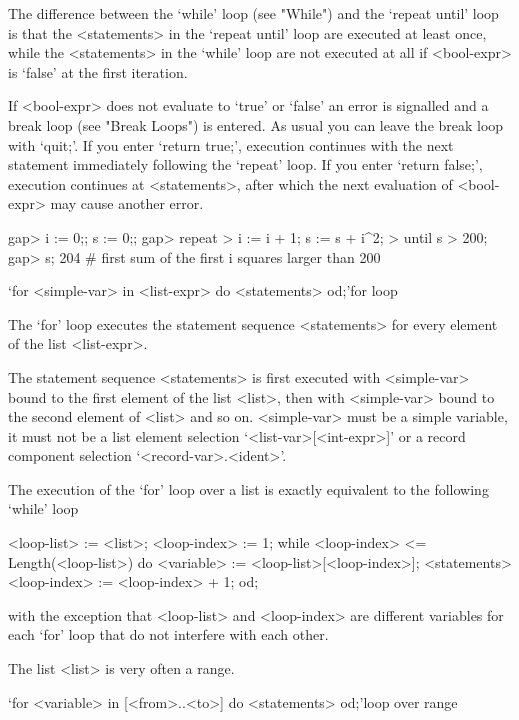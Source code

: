 The difference between the `while' loop (see "While") and the `repeat
until' loop is that the <statements> in the `repeat until' loop are
executed at least once, while the <statements> in the `while' loop are
not executed at all if <bool-expr> is `false' at the first iteration.

If <bool-expr> does not evaluate to `true'  or `false' an error is
signalled and a break loop (see "Break Loops") is entered. As usual you
can leave the break loop with `quit;'.  If you enter `return true;',
execution continues with the next statement  immediately following the
`repeat' loop.  If you enter `return  false;', execution continues at
<statements>, after which the next evaluation of <bool-expr> may cause
another error.

\beginexample
gap> i := 0;; s := 0;;
gap> repeat
>    i := i + 1; s := s + i^2;
>  until s > 200;
gap> s;
204    # first sum of the first i squares larger than 200
\endexample



\>`for <simple-var> in <list-expr> do <statements> od;'{for loop}

The `for' loop executes  the statement sequence <statements> for every
element of the list <list-expr>.

The statement sequence <statements> is first executed with <simple-var>
bound to the first element of the list <list>, then with <simple-var>
bound to the second element of <list> and so on. <simple-var> must be a
simple variable,  it  must not   be  a list   element  selection
`<list-var>[<int-expr>]'   or    a  record  component selection
`<record-var>.<ident>'.

The execution of the `for' loop over a list is exactly equivalent to
the following `while' loop

\begintt
<loop-list> := <list>;
<loop-index> := 1;
while <loop-index> <= Length(<loop-list>) do
  <variable> := <loop-list>[<loop-index>];
  <statements>
  <loop-index> := <loop-index> + 1;
od;
\endtt

with the  exception  that <loop-list> and <loop-index> are different
variables for each `for' loop that do not interfere with each other.

The list <list> is very often a range.

\>`for <variable> in [<from>..<to>] do <statements> od;'{loop over range}

